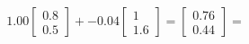 \documentclass[preview]{standalone}
\begin{document}
\begin{align*}
1.00 \begin{bmatrix} 0.8 \\ 0.5 \end{bmatrix} + -0.04 \begin{bmatrix} 1 \\ 1.6 \end{bmatrix} = \begin{bmatrix} 0.76 \\ 0.44 \end{bmatrix} =
\end{align*}
\end{document}
